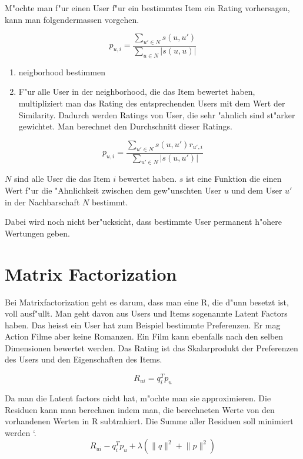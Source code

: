 \documentclass[a4paper, 11pt]{article}
\begin{document}
M"ochte man f"ur einen User f"ur ein bestimmtes Item ein Rating vorhersagen, kann man folgendermassen vorgehen.

\begin{equation}
  p_{u,i} = \frac{\sum_{u' \in N}s(u,u')}{\sum_{u \in N}|s(u,u)|}
\end{equation}

\begin{enumerate}
\item neigborhood bestimmen
\item F"ur alle User in der neighborhood, die das Item bewertet haben, multipliziert man das Rating des entsprechenden Users mit dem Wert der Similarity. Dadurch werden Ratings von User, die sehr "ahnlich sind st"arker gewichtet. Man berechnet den Durchschnitt dieser Ratings.

\end{enumerate}

\begin{equation}
  \label{eq:computeprediction}
  p_{u,i} = \frac{\sum_{u' \in N}{s(u,u') r_{u',i}}}{\sum_{u' \in N}{|s(u,u')|}}
\end{equation}

$N$ sind alle User die das Item $i$ bewertet haben. $s$ ist eine Funktion die einen Wert f"ur die "Ahnlichkeit zwischen dem gew"unschten User $u$ und dem User $u'$ in der Nachbarschaft $N$ bestimmt.

Dabei wird noch nicht ber"ucksicht, dass bestimmte User permanent h"ohere Wertungen geben.

\section{Matrix Factorization}
\label{sec:matrixfactorization}

Bei Matrixfactorization geht es darum, dass man eine R, die d"unn besetzt ist, voll ausf"ullt. Man geht davon aus Users und Items sogenannte Latent Factors haben. Das heisst ein User hat zum Beispiel bestimmte Preferenzen. Er mag Action Filme aber keine Romanzen. Ein Film kann ebenfalls nach den selben Dimensionen bewertet werden. Das Rating ist das Skalarprodukt der Preferenzen des Users und den Eigenschaften des Items.

\begin{equation}
  \label{eq:latentfactors}
  R_{ui} = q_i^T p_u
\end{equation}

Da man die Latent factors nicht hat, m"ochte man sie approximieren. Die Residuen kann man berechnen indem man, die berechneten Werte von den vorhandenen Werten in R subtrahiert. Die Summe aller Residuen soll minimiert werden \cite{koren2009}`.
\begin{equation}
  \label{eq:optimization}
    R_{ui} - q_i^T p_u + \lambda (\lVert q \rVert^2 + \lVert p \lVert ^2)
\end{equation}
\end{document}
